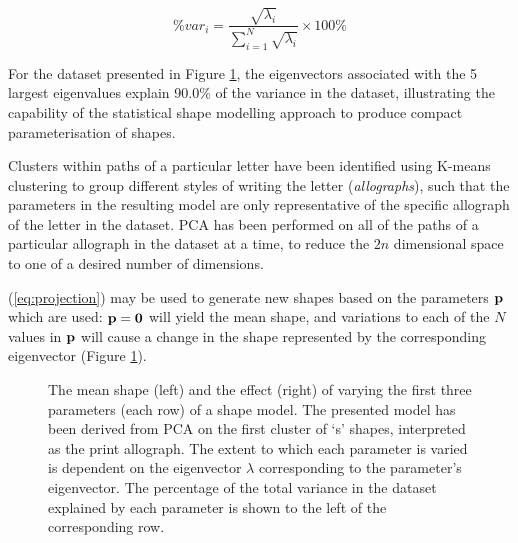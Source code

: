 \documentclass{sig-alternate}
\begin{document}
\begin{equation}\label{eq:proportionVar}
\%var_i = \frac{\sqrt{\lambda_i}}{\sum_{i=1}^{N}\sqrt{\lambda_i}}\times 100\%
\end{equation}

For the dataset presented in Figure \ref{fig:deviations_sPrint}, the
eigenvectors associated with the 5 largest eigenvalues explain 90.0\% of the
variance in the dataset, illustrating the capability of the statistical shape
modelling approach to produce compact parameterisation of shapes. 

Clusters within paths of a particular letter have been identified using K-means
clustering to group different styles of writing the letter (\emph{allographs}),
such that the parameters in the resulting model are only representative of the
specific allograph of the letter in the dataset. 
%
%
PCA has been performed on all of the paths of a particular allograph in the
dataset at a time, to reduce the $2n$ dimensional space to one of a desired
number of dimensions.

(\ref{eq:projection}) may be used
to generate new shapes based on the parameters ${\bf p}$ which are used: ${\bf
p}={\bf 0}$ will yield the mean shape, and variations to each of the $N$ values
in ${\bf p}$ will cause a change in the shape represented by the corresponding
eigenvector (Figure \ref{fig:deviations_sPrint}). 

\begin{figure}[thpb]
\centering
{}
\caption[The mean shape and the effect of varying the first three parameters of
the shape model derived from PCA from the dataset of print `s'
shapes.]{\label{fig:deviations_sPrint}The mean shape (left) and the effect
    (right) of varying the first three parameters (each row) of a shape model.
    The presented model has been derived from PCA on the first cluster of `s'
    shapes, interpreted as the print allograph. The extent to which each
parameter is varied is dependent on the eigenvector $\lambda$ corresponding to
the parameter's eigenvector. The percentage of the total variance in the dataset
explained by each parameter is shown to the left of the corresponding row. }

\end{figure}
\end{document}
